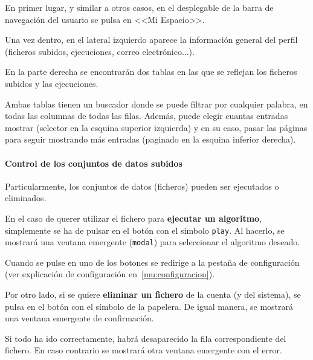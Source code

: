 En primer lugar, y similar a otros casos, en el desplegable de la barra de
navegación del usuario se pulsa en <<Mi Espacio>>.


Una vez dentro, en el lateral izquierdo aparece la información general del
perfil (ficheros subidos, ejecuciones, correo electrónico...).

En la parte derecha se encontrarán dos tablas en las que se reflejan los
ficheros subidos y las ejecuciones.


Ambas tablas tienen un buscador donde se puede filtrar por cualquier palabra, en
todas las columnas de todas las filas. Además, puede elegir cuantas entradas
mostrar (selector en la esquina superior izquierda) y en su caso, pasar las
páginas para seguir mostrando más entradas (paginado en la esquina inferior
derecha).

\paragraph{Control de los conjuntos de datos subidos} Particularmente, los
conjuntos de datos (ficheros) pueden ser ejecutados o eliminados.

En el caso de querer utilizar el fichero para \textbf{ejecutar un algoritmo},
simplemente se ha de pulsar en el botón con el símbolo \texttt{play}. Al
hacerlo, se mostrará una ventana emergente (\texttt{modal}) para seleccionar el
algoritmo deseado.


Cuando se pulse en uno de los botones se redirige a la pestaña de configuración
(ver explicación de configuración en~\ref{mu:configuracion}).

\label{mu:eliminardataset}
Por otro lado, si se quiere \textbf{eliminar un fichero} de la cuenta (y del
sistema), se pulsa en el botón con el símbolo de la papelera. De igual manera,
se mostrará una ventana emergente de confirmación.


Si todo ha ido correctamente, habrá desaparecido la fila correspondiente del
fichero. En caso contrario se mostrará otra ventana emergente con el error.

